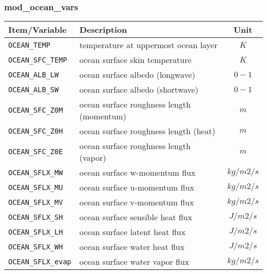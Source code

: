 \subsubsection{mod\_ocean\_vars}
 \begin{tabularx}{150mm}{|l|X|c|} \hline
 \rowcolor[gray]{0.9} Item/Variable & Description  & Unit \\\hline
  \verb|OCEAN_TEMP|      & temperature at uppermost ocean layer & $K$ \\\hline
  \verb|OCEAN_SFC_TEMP|  & ocean surface skin temperature       & $K$ \\\hline
  \verb|OCEAN_ALB_LW|    & ocean surface albedo (longwave)      & $0-1$ \\\hline
  \verb|OCEAN_ALB_SW|    & ocean surface albedo (shortwave)     & $0-1$ \\\hline
  \verb|OCEAN_SFC_Z0M|   & ocean surface roughness length (momentum) & $m$ \\\hline
  \verb|OCEAN_SFC_Z0H|   & ocean surface roughness length (heat)     & $m$ \\\hline
  \verb|OCEAN_SFC_Z0E|   & ocean surface roughness length (vapor)    & $m$ \\\hline
  \verb|OCEAN_SFLX_MW|   & ocean surface w-momentum flux        & $kg/m2/s$ \\\hline
  \verb|OCEAN_SFLX_MU|   & ocean surface u-momentum flux        & $kg/m2/s$ \\\hline
  \verb|OCEAN_SFLX_MV|   & ocean surface v-momentum flux        & $kg/m2/s$ \\\hline
  \verb|OCEAN_SFLX_SH|   & ocean surface sensible heat flux     & $J/m2/s$ \\\hline
  \verb|OCEAN_SFLX_LH|   & ocean surface latent heat flux       & $J/m2/s$ \\\hline
  \verb|OCEAN_SFLX_WH|   & ocean surface water heat flux        & $J/m2/s$ \\\hline
  \verb|OCEAN_SFLX_evap| & ocean surface water vapor flux       & $kg/m2/s$ \\\hline
 \end{tabularx}

